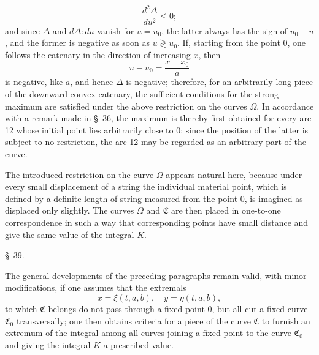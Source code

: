 \documentclass[11pt,a4paper,leqno]{article}
\begin{document}
\[
\frac{d^2\Delta}{du^2}\leq0;
\]
and since $\Delta$ and $d\Delta:du$ vanish for $u=u_0$, the latter always has the sign of $u_0-u$, and the former is negative as soon as $u\gtrless u_0$. If, starting from the point 0, one follows the catenary in the direction of increasing $x$, then
\[
u-u_0=\frac{x-x_0}{a}
\]
is negative, like $a$, and hence $\Delta$ is negative; therefore, for an arbitrarily long piece of the downward-convex catenary, the sufficient conditions for the strong maximum are satisfied under the above restriction on the curves $\Omega$. In accordance with a remark made in \S~36, the maximum is thereby first obtained for every arc 12 whose initial point lies arbitrarily close to 0; since the position of the latter is subject to no restriction, the arc 12 may be regarded as an arbitrary part of the curve.

The introduced restriction on the curve $\Omega$ appears natural here, because under every small displacement of a string the individual material point, which is defined by a definite length of string measured from the point 0, is imagined as displaced only slightly. The curves $\Omega$ and $\mathfrak{C}$ are then placed in one-to-one correspondence in such a way that corresponding points have small distance and give the same value of the integral $K$.

\begin{center}
{\large \S~39.}
\end{center}

The general developments of the preceding paragraphs remain valid, with minor modifications, if one assumes that the extremals
\begin{equation}\tag{24}
x=\xi(t,a,b),\quad y=\eta(t,a,b),
\end{equation}
to which $\mathfrak{C}$ belongs do not pass through a fixed point 0, but all cut a fixed curve $\mathfrak{C}_0$ transversally; one then obtains criteria for a piece of the curve $\mathfrak{C}$ to furnish an extremum of the integral among all curves joining a fixed point to the curve $\mathfrak{C}_0$ and giving the integral $K$ a prescribed value.
\end{document}
